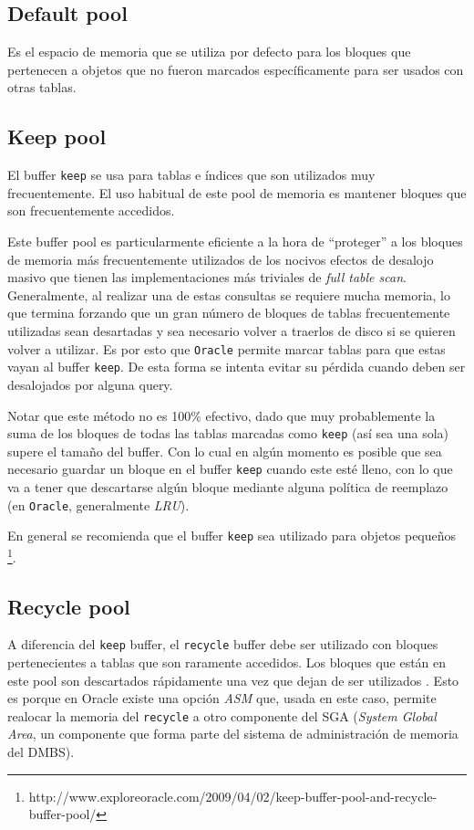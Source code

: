 \subsection{Default pool}
Es el espacio de memoria que se utiliza por defecto para los bloques que pertenecen a objetos que no fueron marcados específicamente para ser usados con otras tablas.

\subsection{Keep pool}
El buffer \texttt{keep} se usa para tablas e índices que son utilizados muy frecuentemente. El uso habitual de este pool de memoria es mantener bloques que son frecuentemente accedidos. 

Este buffer pool es particularmente eficiente a la hora de ``proteger'' a los bloques de memoria más frecuentemente utilizados de los nocivos efectos de desalojo masivo que tienen las implementaciones más triviales de \textit{full table scan}. Generalmente, al realizar una de estas consultas se requiere mucha memoria, lo que termina forzando que un gran número de bloques de tablas frecuentemente utilizadas sean desartadas y sea necesario volver a traerlos de disco si se quieren volver a utilizar. Es por esto que \texttt{Oracle} permite marcar tablas para que estas vayan al buffer \texttt{keep}. De esta forma se intenta evitar su pérdida cuando deben ser desalojados por alguna query.

Notar que este método no es 100\% efectivo, dado que muy probablemente la suma de los bloques de todas las tablas marcadas como \texttt{keep} (así sea una sola) supere el tamaño del buffer. Con lo cual en algún momento es posible que sea necesario guardar un bloque en el buffer \texttt{keep} cuando este esté lleno, con lo que va a tener que descartarse algún bloque mediante alguna política de reemplazo (en \texttt{Oracle}, generalmente \textit{LRU}). 

En general se recomienda que el buffer \texttt{keep} sea utilizado para objetos pequeños \footnote{http://www.exploreoracle.com/2009/04/02/keep-buffer-pool-and-recycle-buffer-pool/}.

\subsection{Recycle pool}
A diferencia del \texttt{keep} buffer, el \texttt{recycle} buffer debe ser utilizado con bloques pertenecientes a tablas que son raramente accedidos. Los bloques que están en este pool son descartados rápidamente una vez que dejan de ser utilizados \footnotemark[\value{footnote}]. Esto es porque en Oracle existe una opción \textit{ASM} que, usada en este caso, permite realocar la memoria del \texttt{recycle} a otro componente del SGA (\textit{System Global Area}, un componente que forma parte del sistema de administración de memoria del DMBS).

